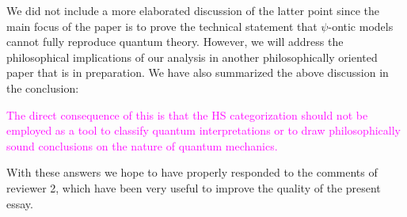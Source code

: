 \documentclass[11pt, executivepaper]{article}
\begin{document}
\begin{enumerate}
\noindent We did not include a more elaborated discussion of the latter point since the main focus of the paper is to prove the technical statement that $\psi$-ontic models cannot fully reproduce quantum theory. However, we will address the philosophical implications of our analysis in another philosophically oriented paper that is in preparation. We have also summarized the above discussion in the conclusion:

\textcolor{magenta}{The direct consequence of this is that the HS categorization should not be employed as a tool to classify quantum interpretations or to draw philosophically sound conclusions on the nature of quantum mechanics.}

 
\end{enumerate}



\noindent With these answers we hope to have properly responded to the comments of reviewer 2, which have been very useful to improve the quality of the present essay.
\end{document}
